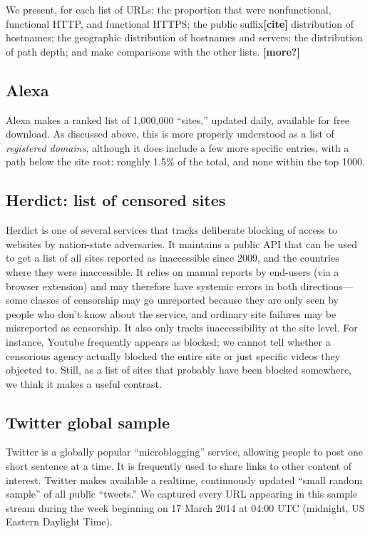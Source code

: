 \documentclass{zarticle}
\def\todo#1{{\color{todocolor}\bfseries [#1]}}
\begin{document}
We present, for each list of URLs: the proportion that were
nonfunctional, functional HTTP, and functional HTTPS; the public
suffix\todo{cite} distribution of hostnames; the geographic
distribution of hostnames and servers; the distribution of path depth;
and make comparisons with the other lists. \todo{more?}

\subsection{Alexa}

Alexa makes a ranked list of 1,000,000 “sites,” updated daily,
available for free download.  As discussed above, this is more
properly understood as a list of \emph{registered domains}, although
it does include a few more specific entries, with a path below the
site root: roughly 1.5\% of the total, and none within the top 1000.

\subsection{Herdict: list of censored sites}

Herdict is one of several services that tracks deliberate blocking of
access to websites by nation-state adversaries.  It maintains a public
API that can be used to get a list of all sites reported as
inaccessible since 2009, and the countries where they were
inaccessible.  It relies on manual reports by end-users (via a browser
extension) and may therefore have systemic errors in both
directions---some classes of censorship may go unreported because they
are only seen by people who don't know about the service, and ordinary
site failures may be misreported as censorship.  It also only tracks
inaccessibility at the site level.  For instance, Youtube frequently
appears as blocked; we cannot tell whether a censorious agency
actually blocked the entire site or just specific videos they objected
to. Still, as a list of sites that probably have been blocked
somewhere, we think it makes a useful contrast.

\subsection{Twitter global sample}

Twitter is a globally popular “microblogging” service, allowing people
to post one short sentence at a time.  It is frequently used to share
links to other content of interest.  Twitter makes available a
realtime, continuously updated “small random sample” of all public
“tweets.” We captured every URL appearing in this sample stream during
the week beginning on 17 March 2014 at 04:00 UTC (midnight, US Eastern
Daylight Time).
\end{document}
